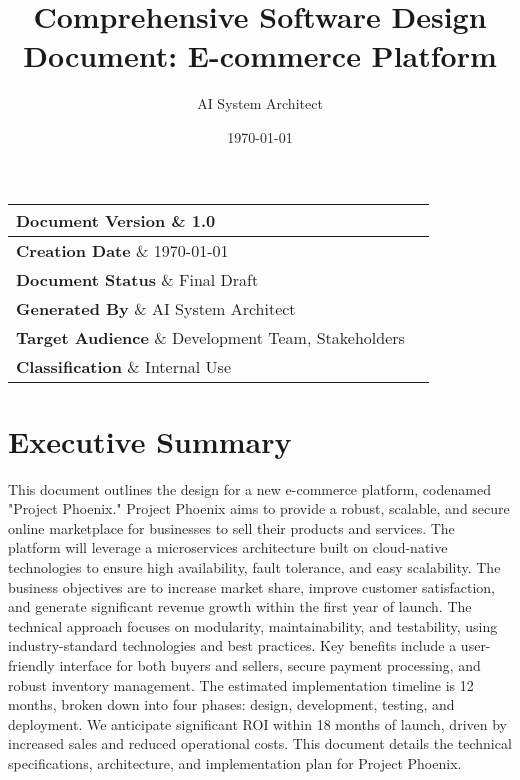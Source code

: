 \documentclass[11pt,a4paper,oneside]{article}
\title{\Huge\textbf{Comprehensive Software Design Document: E-commerce Platform}}
\author{\Large AI System Architect}
\date{\Large\today}
\begin{document}
\maketitle
\thispagestyle{empty}
\vfill

\begin{center}
\large
\begin{tabular}{|l|l|}
\hline
\textbf{Document Version} \& 1.0 \\
\hline
\textbf{Creation Date} \& \today \\
\hline
\textbf{Document Status} \& Final Draft \\
\hline
\textbf{Generated By} \& AI System Architect \\
\hline
\textbf{Target Audience} \& Development Team, Stakeholders \\
\hline
\textbf{Classification} \& Internal Use \\
\hline
\end{tabular}
\end{center}

\newpage
\tableofcontents
\newpage
\listoffigures
\newpage

\section{Executive Summary}

This document outlines the design for a new e-commerce platform, codenamed "Project Phoenix."  Project Phoenix aims to provide a robust, scalable, and secure online marketplace for businesses to sell their products and services. The platform will leverage a microservices architecture built on cloud-native technologies to ensure high availability, fault tolerance, and easy scalability.  The business objectives are to increase market share, improve customer satisfaction, and generate significant revenue growth within the first year of launch. The technical approach focuses on modularity, maintainability, and testability, using industry-standard technologies and best practices. Key benefits include a user-friendly interface for both buyers and sellers, secure payment processing, and robust inventory management. The estimated implementation timeline is 12 months, broken down into four phases: design, development, testing, and deployment.  We anticipate significant ROI within 18 months of launch, driven by increased sales and reduced operational costs.  This document details the technical specifications, architecture, and implementation plan for Project Phoenix.
\end{document}

